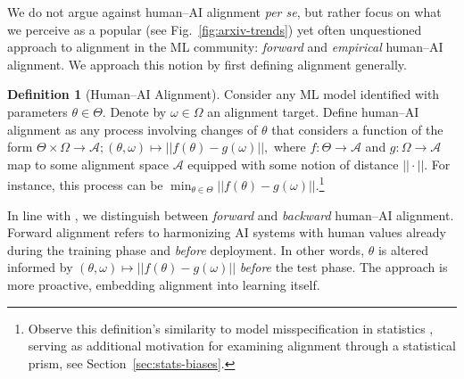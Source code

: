 \documentclass{article}
\theoremstyle{plain}
\theoremstyle{definition}
\newtheorem{definition}[theorem]{Definition}
\theoremstyle{remark}
\begin{document}
We do not argue against human--AI alignment \textit{per se}, but rather focus on what we perceive as a popular (see Fig.~\ref{fig:arxiv-trends}) yet often unquestioned approach to alignment in the ML community: \textit{forward} and \textit{empirical} human--AI alignment.
%
We approach this notion by first defining alignment generally.

\begin{definition}[Human--AI Alignment]\label{def:main}
Consider any ML model identified with parameters $ \theta \in \Theta$. Denote by $\omega \in \Omega$ an alignment target. 
Define human--AI alignment as any process involving changes of $\theta$ that considers a function of the form  $\Theta \times \Omega \to \mathcal{A}; (\theta,\omega) \mapsto ||f(\theta) - g(\omega)||,$
where $f: \Theta \rightarrow \mathcal{A}$ and $g: \Omega \rightarrow \mathcal{A}$ map to some alignment space $\mathcal{A}$ equipped with some notion of distance $||\cdot||$. %
For instance, this process can be 
    $
     \min_{\theta \in \Theta} ||f(\theta) - g(\omega)|| .
    $\footnote{
Observe this definition's similarity to model misspecification in statistics \cite{white1982maximum}, serving as additional motivation for examining alignment through a statistical prism, see Section~\ref{sec:stats-biases}.}

\end{definition}     

In line with \citet{ji2023ai}, we distinguish between \textit{forward} and \textit{backward} human--AI alignment. Forward alignment refers to harmonizing AI systems with human values already during the training phase and \textit{before} deployment. In other words, $\theta$ is altered informed by $(\theta,\omega) \mapsto ||f(\theta) - g(\omega)||$ \textit{before} the test phase. 
The approach is more proactive, embedding alignment into learning itself.
\end{document}
